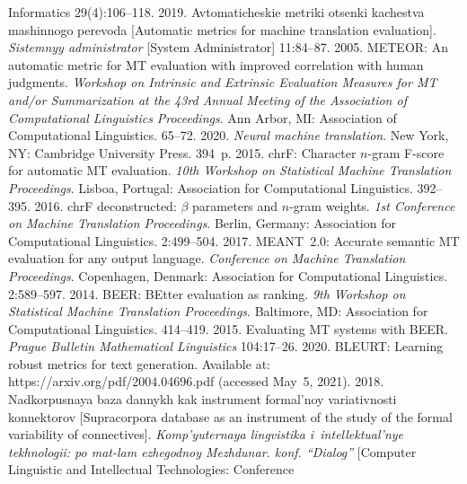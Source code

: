 \begin{multicols}{2}
{{\begin{thebibliography}{99}
{Informatics} 29(4):106--118.
 2019. Avtomaticheskie metriki otsenki 
kachestva mashinnogo perevoda [Automatic metrics for machine translation evaluation]. \textit{Sistemnyy 
administrator} [System Administrator] 11:84--87.
 2005. METEOR: An automatic metric for MT evaluation with 
improved correlation with human judgments. \textit{Workshop on Intrinsic and Extrinsic 
Evaluation Measures for MT and/or Summarization at the 
43rd Annual Meeting of the Association of Computational 
Linguistics Proceedings}. Ann Arbor, MI: Association of Computational Linguistics. 65--72.
 2020. \textit{Neural machine translation}. New York, NY: Cambridge University 
Press. 394~p.
 2015. chrF: Character $n$-gram F-score for automatic MT evaluation. 
\textit{10th Workshop 
on Statistical Machine Translation Proceedings}. Lisboa, Portugal: Association for Computational 
Linguistics. 392--395.
 2016. chrF deconstructed: $\beta$ parameters and $n$-gram weights. 
\textit{1st Conference on 
Machine Translation Proceedings}. Berlin, Germany: Association for Computational Linguistics. 2:499--504.
 2017. MEANT~2.0: Accurate semantic MT evaluation for any output language. 
\textit{Conference on Machine Translation Proceedings}. Copenhagen, Denmark: Association for Computational 
Linguistics. 2:589--597.
 2014. BEER: BEtter evaluation as ranking. 
\textit{9th Workshop on 
Statistical Machine Translation Proceedings}. Baltimore, MD: Association for Computational 
Linguistics. 414--419.
 2015. Evaluating MT systems with BEER. 
\textit{Prague Bulletin Mathematical Linguistics} 104:17--26.
 2020. BLEURT: Learning robust metrics for text 
generation. Available at: {\sf https://arxiv.org/pdf/2004.04696.pdf} (accessed May~5, 2021).
 2018. Nadkorpusnaya baza dannykh kak instrument formal'noy variativnosti 
konnektorov [Supracorpora database as an instrument of the study of the formal variability of 
connectives]. \textit{Komp'yuternaya ling\-vi\-sti\-ka i~intellektual'nye tekhnologii: po mat-lam ezhegodnoy 
Mezhdunar. konf. ``Dialog''} [Computer Linguistic and Intellectual Technologies: Conference 

\end{thebibliography}}}
\end{multicols}
